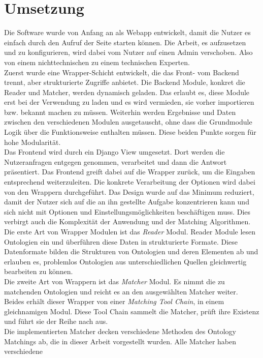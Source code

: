 \section{Umsetzung}
Die Software wurde von Anfang an als Webapp entwickelt, damit die Nutzer es
einfach durch den Aufruf der Seite starten können. Die Arbeit, es aufzusetzen
und zu konfigurieren, wird dabei vom Nutzer auf einen Admin verschoben. Also von
einem nichttechnischen zu einem technischen Experten.\\
Zuerst wurde eine Wrapper-Schicht entwickelt, die das Front- vom Backend
trennt, aber strukturierte Zugriffe anbietet. Die Backend Module, konkret die
Reader und Matcher, werden dynamisch geladen. Das erlaubt es, diese Module erst
bei der Verwendung zu laden und es wird vermieden, sie vorher importieren bzw.
bekannt machen zu müssen. Weiterhin werden Ergebnisse und Daten zwischen den
verschiedenen Modulen ausgetauscht, ohne dass die Grundmodule Logik über die
Funktionsweise enthalten müssen. Diese beiden Punkte sorgen für hohe
Modularität.\\
Das Frontend wird durch ein Django View umgesetzt. Dort werden die
Nutzeranfragen entgegen genommen, verarbeitet und dann die Antwort
präsentiert. Das Frontend greift dabei auf die Wrapper zurück, um die Eingaben
entsprechend weiterzuleiten. Die konkrete Verarbeitung der Optionen wird dabei
von den Wrappern durchgeführt. Das Design wurde auf das Minimum reduziert, damit
der Nutzer sich auf die an ihn gestellte Aufgabe konzentrieren kann und sich nicht
mit Optionen und Einstellungsmöglichkeiten beschäftigen muss. Dies verbirgt
auch die Komplexität der Anwendung und der Matching Algorithmen.\\
Die erste Art von Wrapper Modulen ist das \textit{Reader} Modul. Reader Module
lesen Ontologien ein und überführen diese Daten in strukturierte Formate.
Diese Datenformate bilden die Strukturen von Ontologien und deren Elementen ab
und erlauben es, problemlos Ontologien aus unterschiedlichen Quellen
gleichwertig bearbeiten zu können.\\
Die zweite Art von Wrappern ist das \textit{Matcher} Modul. Es nimmt die zu
matchenden Ontologien und reicht es an den ausgewählten Matcher weiter. Beides erhält
dieser Wrapper von einer \textit{Matching Tool Chain}, in einem
gleichnamigen Modul. Diese Tool Chain sammelt die Matcher, prüft ihre
Existenz und führt sie der Reihe nach aus.\\
Die implementierten Matcher decken verschiedene Methoden des Ontology Matchings
ab, die in dieser Arbeit vorgestellt wurden. Alle Matcher haben verschiedene
